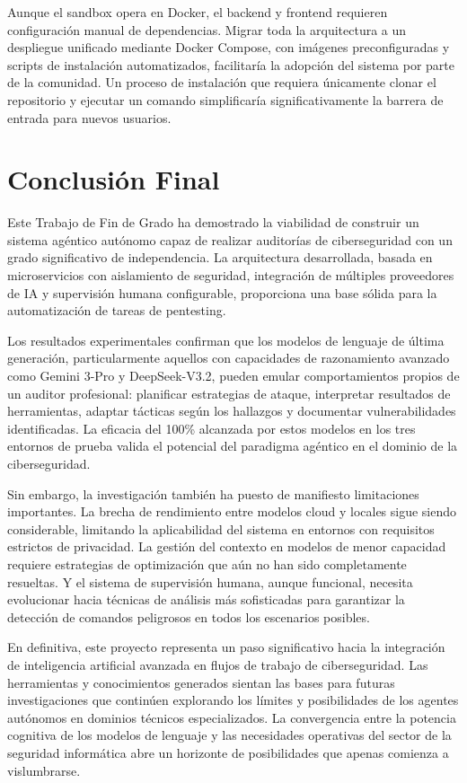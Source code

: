 Aunque el sandbox opera en Docker, el backend y frontend requieren configuración manual de dependencias. Migrar toda la arquitectura a un despliegue unificado mediante Docker Compose, con imágenes preconfiguradas y scripts de instalación automatizados, facilitaría la adopción del sistema por parte de la comunidad. Un proceso de instalación que requiera únicamente clonar el repositorio y ejecutar un comando simplificaría significativamente la barrera de entrada para nuevos usuarios.


\section{Conclusión Final}
\label{sec:conclusion_final}

Este Trabajo de Fin de Grado ha demostrado la viabilidad de construir un sistema agéntico autónomo capaz de realizar auditorías de ciberseguridad con un grado significativo de independencia. La arquitectura desarrollada, basada en microservicios con aislamiento de seguridad, integración de múltiples proveedores de IA y supervisión humana configurable, proporciona una base sólida para la automatización de tareas de pentesting.

Los resultados experimentales confirman que los modelos de lenguaje de última generación, particularmente aquellos con capacidades de razonamiento avanzado como Gemini 3-Pro y DeepSeek-V3.2, pueden emular comportamientos propios de un auditor profesional: planificar estrategias de ataque, interpretar resultados de herramientas, adaptar tácticas según los hallazgos y documentar vulnerabilidades identificadas. La eficacia del 100\% alcanzada por estos modelos en los tres entornos de prueba valida el potencial del paradigma agéntico en el dominio de la ciberseguridad.

Sin embargo, la investigación también ha puesto de manifiesto limitaciones importantes. La brecha de rendimiento entre modelos cloud y locales sigue siendo considerable, limitando la aplicabilidad del sistema en entornos con requisitos estrictos de privacidad. La gestión del contexto en modelos de menor capacidad requiere estrategias de optimización que aún no han sido completamente resueltas. Y el sistema de supervisión humana, aunque funcional, necesita evolucionar hacia técnicas de análisis más sofisticadas para garantizar la detección de comandos peligrosos en todos los escenarios posibles.

En definitiva, este proyecto representa un paso significativo hacia la integración de inteligencia artificial avanzada en flujos de trabajo de ciberseguridad. Las herramientas y conocimientos generados sientan las bases para futuras investigaciones que continúen explorando los límites y posibilidades de los agentes autónomos en dominios técnicos especializados. La convergencia entre la potencia cognitiva de los modelos de lenguaje y las necesidades operativas del sector de la seguridad informática abre un horizonte de posibilidades que apenas comienza a vislumbrarse.